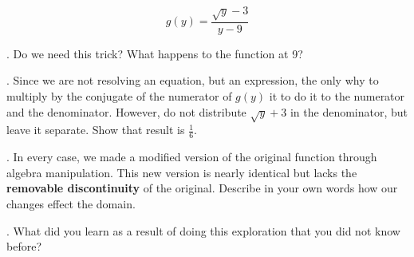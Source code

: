 \begin{multicols*}{2}
$$
g(y) = \frac{\sqrt{y}-3}{y-9}
$$

\vspace{1cm}

.  Do we need this trick?  What happens to the function at 9?

\vspace{1cm}

. Since we are not resolving an equation, but an expression, the only why to multiply by the 
conjugate of the numerator of $g(y)$ it to do it to the numerator and the denominator.  However,
do not distribute $\sqrt{y}+3$ in the denominator, but leave it separate.  Show that result is
$\frac{1}{6}$.

\vspace{2cm}

.  In every case, we made a modified version of the original function through algebra manipulation.
This new version is nearly identical but lacks the \textbf{removable discontinuity} of the original.
Describe in your own words how our changes effect the domain.

\vspace{3cm}
. What did you learn as a result of doing this exploration that you did not know before?


\end{multicols*}